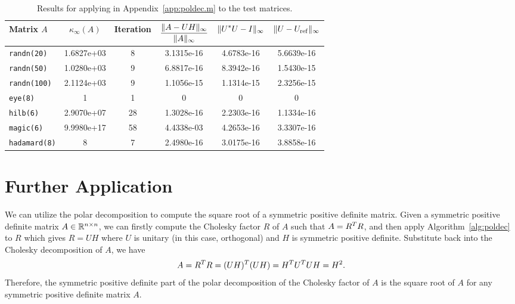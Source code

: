 \documentclass[12pt]{article}
\begin{document}
\begin{table}[H]
    \centering 
    \caption{Results for applying  in Appendix~\ref{app:poldec.m} to the test matrices.}
    \label{tab:numerical-data}
    \begin{tabular}{lccccc}
        \toprule 
            {Matrix $A$} & {\(\displaystyle \kappa_\infty(A)\)} & {Iteration} & {\(\displaystyle \frac{\|{A - UH}\|_\infty}{\|{A}\|_\infty}\)} & {\(\displaystyle \|{U^* U - I}\|_{\infty}\)} & {$\|{U - U_{\mathrm{ref}}}\|_{\infty}$}\\
        \toprule 
        \texttt{randn(20)} & 1.6827e+03 & 8 & 3.1315e-16 & 4.6783e-16 & 5.6639e-16 \\
        \midrule 
        \texttt{randn(50)} & 1.0280e+03 & 9 & 6.8817e-16 & 8.3942e-16 & 1.5430e-15\\
        \midrule 
        \texttt{randn(100)} & 2.1124e+03 & 9 & 1.1056e-15 & 1.1314e-15 & 2.3256e-15\\
        \midrule 
        \texttt{eye(8)} & 1 & 1 & 0 & 0 & 0\\
        \midrule 
        \texttt{hilb(6)} & 2.9070e+07 & 28 & 1.3028e-16 & 2.2303e-16 & 1.1334e-16  \\
        \midrule 
        \texttt{magic(6)} & 9.9980e+17 & 58 & 4.4338e-03 & 4.2653e-16 & 3.3307e-16\\
        \midrule 
        \texttt{hadamard(8)} & 8 & 7 & 2.4980e-16 & 3.0175e-16 & 3.8858e-16\\
        \bottomrule
    \end{tabular}
\end{table}

\section{Further Application}
We can utilize the polar decomposition to compute the square root of a symmetric positive definite matrix. Given a symmetric positive definite matrix $A\in\mathbb{R}^{n\times n}$, we can firstly compute the Cholesky factor $R$ of $A$ such that $A = R^T R$, and then apply Algorithm~\ref{alg:poldec} to $R$ which gives $R = UH$ where $U$ is unitary (in this case, orthogonal) and $H$ is symmetric positive definite. Substitute back into the Cholesky decomposition of $A$, we have 
\begin{equation}
    \notag 
    A = R^T R = (UH)^T (UH) = H^T U^T U H = H^2.
\end{equation}
Therefore, the symmetric positive definite part of the polar decomposition of the Cholesky factor of $A$ is the square root of $A$ for any symmetric positive definite matrix $A$.
\end{document}
